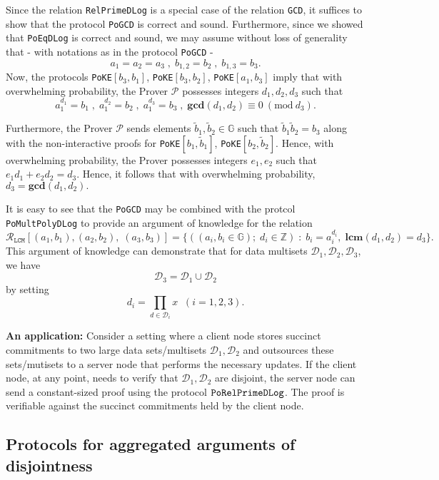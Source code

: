 \documentclass[11pt, lettersize, notitlepage, leqno, footskip=0.6cm]{article}
\newcommand{\bz}{\mathbb Z}
\newcommand{\ttt}{\texttt}
\newcommand{\wti}{\widetilde}
\newcommand{\mc}{\mathcal}
\newcommand{\mb}{\mathbb}
\newcommand{\mbf}{\mathbf}
\newcommand{\mP}{\mc{P}}
\newcommand{\vs}{\vspace{-0.15cm}}
\newcommand{\noin}{\noindent}
\newcommand{\op}{overwhelming probability}
\newcommand{\Mod}[1]{\ (\mathrm{mod}\ #1)}
\newcommand{\LCM}{\mbf{lcm}}
\newcommand{\GCD}{\mbf{gcd}}
\numberwithin{equation}{section}
\begin{document}
\begin{prf} Since the relation \verb|RelPrimeDLog| is a special case of the relation \verb|GCD|, it suffices to show that the protocol \verb|PoGCD| is correct and sound. Furthermore, since we showed that \verb|PoEqDLog| is correct and sound, we may assume without loss of generality that - with notations as in the protocol \verb|PoGCD| - \vs $$a_1 = a_2 = a_3\;,\; {b}_{1,2} = b_2\;,\;{b}_{1,3} = b_3 .$$ Now, the protocols \verb|PoKE|$[b_3, b_1]$, \verb|PoKE|$[b_3, b_2]$, \verb|PoKE|$[a_1, b_3]$ imply that with \op, the Prover $\mP$ possesses integers $d_1,d_2,d_3$ such that \vs $$a_1^{d_1} = b_1\;,\;a_1^{d_2} = b_2\;,\;a_1^{d_3} = b_3\;,\;\GCD(d_1,d_2)\equiv 0\Mod{d_3}.$$ 

Furthermore, the Prover $\mP$ sends elements $\wti{b}_1, \wti{b}_2\in \mb{G}$ such that $\wti{b}_1\wti{b}_2 = b_3$ along with the non-interactive proofs for \verb|PoKE|$[b_1,\wti{b}_1]$, \verb|PoKE|$[b_2,\wti{b}_2]$. Hence, with \op, the Prover possesses integers $e_1,e_2$ such that $e_1d_1+e_2d_2 = d_3$. Hence, it follows that with \op, $d_3 = \GCD(d_1,d_2).$ 
\end{prf}


It is easy to see that the \verb|PoGCD| may be combined with the protcol \verb|PoMultPolyDLog| to provide an argument of knowledge for the relation \vs $$\mc{R}_{{\ttt{LCM}}}[(a_1,b_1),(a_2,b_2), \; (a_3, b_3)] = \{((a_i, b_i\in\mb{G});\;d_i\in\bz)\;:\; b_i = a_i^{d_i},\;\LCM(d_1,d_2)=d_3 \} .$$ This argument of knowledge can demonstrate that for data multisets $\mc{D}_1,\mc{D}_2, \mc{D}_3$, we have \vs $$\mc{D}_3 = \mc{D}_1\cup \mc{D}_2 $$ by setting \vs $$ d_i = \prod\limits_{d\in\mc{D}_i} x\;\;(i=1,2,3).$$

\noin \textbf{An application:} Consider a setting where a client node stores succinct commitments to two large data sets/multisets $\mc{D}_1, \mc{D}_2$ and outsources these sets/mutisets to a server node that performs the necessary updates. If the client node, at any point, needs to verify that $\mc{D}_1, \mc{D}_2$ are disjoint, the server node can send a constant-sized proof using the protocol $\tt{PoRelPrimeDLog}$. The proof is verifiable against the succinct commitments held by the client node.






\subsection{\fontsize{11}{11}\selectfont Protocols for aggregated arguments of disjointness}
\end{document}
